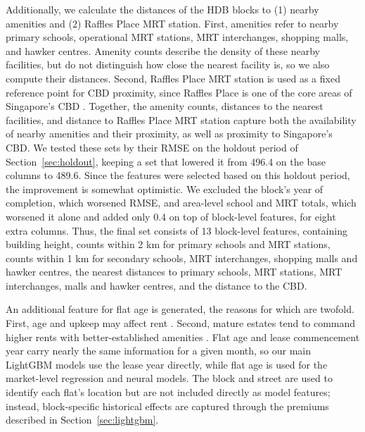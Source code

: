 Additionally, we calculate the distances of the HDB blocks to (1) nearby amenities and (2) Raffles Place MRT station. First, amenities refer to nearby primary schools, operational MRT stations, MRT interchanges, shopping malls, and hawker centres. Amenity counts describe the density of these nearby facilities, but do not distinguish how close the nearest facility is, so we also compute their distances. Second, Raffles Place MRT station is used as a fixed reference point for CBD proximity, since Raffles Place is one of the core areas of Singapore's CBD \cite{URA:2026:CBD}. Together, the amenity counts, distances to the nearest facilities, and distance to Raffles Place MRT station capture both the availability of nearby amenities and their proximity, as well as proximity to Singapore's CBD. We tested these sets by their RMSE on the holdout period of Section~\ref{sec:holdout}, keeping a set that lowered it from 496.4 on the base columns to 489.6. Since the features were selected based on this holdout period, the improvement is somewhat optimistic. We excluded the block's year of completion, which worsened RMSE, and area-level school and MRT totals, which worsened it alone and added only 0.4 on top of block-level features, for eight extra columns. Thus, the final set consists of 13 block-level features, containing building height, counts within 2 km for primary schools and MRT stations, counts within 1 km for secondary schools, MRT interchanges, shopping malls and hawker centres, the nearest distances to primary schools, MRT stations, MRT interchanges, malls and hawker centres, and the distance to the CBD.


An additional feature for flat age is generated, the reasons for which are twofold. First, age and upkeep may affect rent \cite{Eng:2022:Factors}. Second, mature estates tend to command higher rents with better-established amenities \cite{Poh:2023:Location}. Flat age and lease commencement year carry nearly the same information for a given month, so our main LightGBM models use the lease year directly, while flat age is used for the market-level regression and neural models. The block and street are used to identify each flat's location but are not included directly as model features; instead, block-specific historical effects are captured through the premiums described in Section~\ref{sec:lightgbm}.


